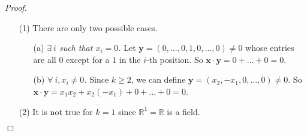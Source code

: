 \documentclass{article}
\begin{document}
\emph{Proof.}
\begin{enumerate}
\item[(1)]
There are only two possible cases.
  \begin{enumerate}
  \item[(a)]
  \emph{$\exists \: i$ such that $x_i = 0$.}
  Let $\mathbf{y} = (0, \ldots, 0, 1, 0, \ldots, 0) \neq 0$
  whose entries are all $0$ except for a $1$ in the $i$-th position.
  So $\mathbf{x} \cdot \mathbf{y} = 0 + \ldots + 0 = 0$.
  \item[(b)]
  \emph{$\forall \: i, x_i \neq 0$.}
  Since $k \geq 2$, we can define
  $\mathbf{y} = (x_2, -x_1, 0, \ldots, 0) \neq 0.$
  So $\mathbf{x} \cdot \mathbf{y} = x_1 x_2 + x_2 (-x_1) + 0 + \ldots + 0 = 0$.
  \end{enumerate}
\item[(2)]
It is not true for $k = 1$ since $\mathbb{R}^1 = \mathbb{R}$ is a field. \\
\end{enumerate}
$\Box$ \\\\



\end{document}

